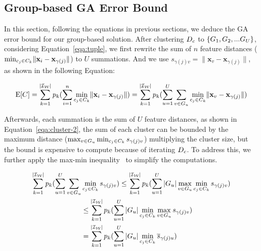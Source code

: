 




\subsection{Group-based GA Error Bound}

In this section, following the equations in previous sections, we deduce the GA error bound for our group-based solution. 
%
After clustering $D_c$ to $\{ G_1 , G_2, ...G_U\}$, considering Equation~\ref{eqa:tuple}, we  first rewrite the sum of $n$ feature distances (\ie $\min_{c_j\in C_k}\lVert\mathbf{x}_i - \mathbf{x}_{\gamma(j)}\rVert$) to $U$ summations. And we use $s_{\gamma(j)v} = \lVert\mathbf{x}_v - \mathbf{x}_{\gamma(j)}\rVert$, as shown in the following Equation:

\begin{equation}\label{eqa:cluster-1}
    \mathrm{E}[C] = \sum_{k= 1}^{|\mathcal{I_W}|} p_k (\sum_{i=1}^n \min_{c_j\in C_k}\lVert\mathbf{x}_i - \mathbf{x}_{\gamma(j)}\rVert) =  \sum_{k= 1}^{|\mathcal{I_W}|} p_k (\sum_{u=1}^U\sum_{v \in G_u} \min_{c_j\in C_k}\lVert\mathbf{x}_v - \mathbf{x}_{\gamma(j)}\rVert)
\end{equation}

Afterwards, each summation is the sum of $U$ feature distances, as shown in Equation~\ref{eqa:cluster-2},  the sum of each cluster can be bounded by  the maximum distance ($\max_{v \in G_u} \min_{c_j\in C_k} s_{\gamma(j)v}$)  multiplying the  cluster size, but the bound is expensive to compute because of iterating $D_c$. To address this, we further apply the max-min inequality~\cite{} to simplify the computations. 


\begin{equation}\label{eqa:cluster-2}
    \begin{aligned}
        \sum_{k= 1}^{|\mathcal{I_W}|} p_k (\sum_{u=1}^U\sum_{v \in G_u} & \min_{c_j\in C_k} s_{\gamma(j)v}) \leq \sum_{k= 1}^{|\mathcal{I_W}|} p_k (\sum_{u=1}^U |G_u| \max_{v \in G_u} \min_{c_j\in C_k}s_{\gamma(j)v}) \\
        & \leq \sum_{k= 1}^{|\mathcal{I_W}|} p_k (\sum_{u=1}^U |G_u| \min_{c_j\in C_k} \max_{v \in G_u}s_{\gamma(j)v}) \\
        & =  \sum_{k= 1}^{|\mathcal{I_W}|} p_k (\sum_{u=1}^U |G_u| \min_{c_j\in C_k} \overline{s}_{\gamma(j)u})
    \end{aligned}
\end{equation}



